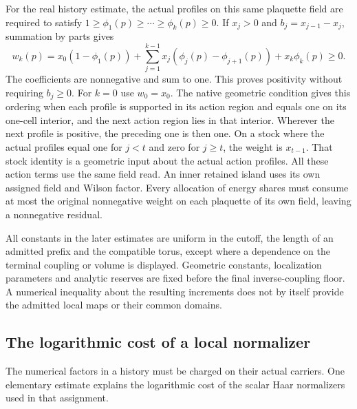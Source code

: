 \documentclass[11pt,letterpaper,reqno]{amsart}
\numberwithin{equation}{section}
\theoremstyle{definition}
\theoremstyle{remark}
\begin{document}
For the real history estimate, the actual profiles on this same
plaquette field are required to satisfy
$1\ge\phi_1(p)\ge\cdots\ge\phi_k(p)\ge0$. If $x_j>0$ and
$b_j=x_{j-1}-x_j$, summation by parts gives
\begin{equation}\label{rt:eq-positive-action-profile}
 w_k(p)=x_0(1-\phi_1(p))
   +\sum_{j=1}^{k-1}x_j(\phi_j(p)-\phi_{j+1}(p))
   +x_k\phi_k(p)\ge0.
\end{equation}
The coefficients are nonnegative and sum to one. This proves
positivity without requiring $b_j\ge0$. For $k=0$ use $w_0=x_0$.
The native geometric condition gives this ordering when each profile
is supported in its action region and equals one on its one-cell
interior, and the next action region lies in that interior. Wherever
the next profile is positive, the preceding one is then one.
On a stock where the actual profiles equal one for $j<t$ and zero
for $j\ge t$, the weight is $x_{t-1}$. That stock identity is a
geometric input about the actual action profiles. All these action
terms use the same field read. An inner retained island uses its
own assigned field and Wilson factor. Every allocation of energy
shares must consume at most the original nonnegative weight on
each plaquette of its own field, leaving a nonnegative residual.

All constants in the later estimates are uniform in the cutoff,
the length of an admitted prefix and the compatible torus,
except where a dependence on the terminal coupling or volume is
displayed. Geometric constants, localization parameters and
analytic reserves are fixed before the final inverse-coupling
floor. A numerical inequality about the resulting increments
does not by itself provide the admitted local maps or their
common domains.

\subsection{The logarithmic cost of a local normalizer}

The numerical factors in a history must be charged on their
actual carriers. One elementary estimate explains the logarithmic
cost of the scalar Haar normalizers used in that assignment.
\end{document}
